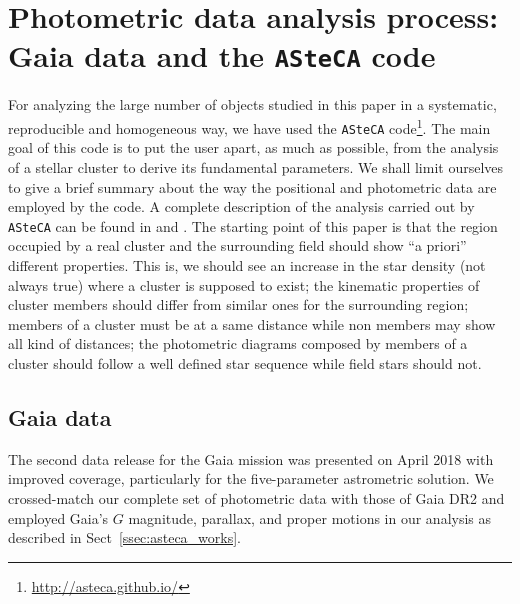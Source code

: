 \documentclass[draft]{aa}
\begin{document}
\section{Photometric data analysis process: Gaia data and the \texttt{ASteCA}
code}
\label{sec:photom_analysis}

For analyzing the large number of objects studied in this paper in a
systematic, reproducible and homogeneous way, we have used the \texttt{ASteCA}
code\footnote{\url{http://asteca.github.io/}}. The main goal of this code is to
put the user apart, as much as possible, from the analysis of a stellar cluster
to derive its fundamental parameters. We shall limit ourselves to give a brief
summary about the way the positional and photometric data are employed by the
code. A complete description of the analysis carried out by
\texttt{ASteCA} can be found in \cite{Perren_2015} and \cite{Perren_2017}.
The starting point of this paper is that the region occupied by a real cluster
and the surrounding field should show ``a priori'' different properties. This
is, we should see an increase in the star density (not always true) where a
cluster is supposed to exist; the kinematic properties of cluster members
should differ from similar ones for the surrounding region; members of a
cluster must be at a same distance while non members may show all kind of
distances; the photometric diagrams composed by members of a cluster should
follow a well defined star sequence while field stars should not. 



\subsection{Gaia data}
\label{ssec:gaia_data}

The second data release for the Gaia mission \citep{GaiaDR2_2018} was presented
on April 2018 with improved coverage, particularly for the five-parameter
astrometric solution.
We crossed-match our complete set of photometric data with those of Gaia DR2
and employed Gaia's $G$ magnitude, parallax, and proper motions in our
analysis as described in Sect~\ref{ssec:asteca_works}.
\end{document}
